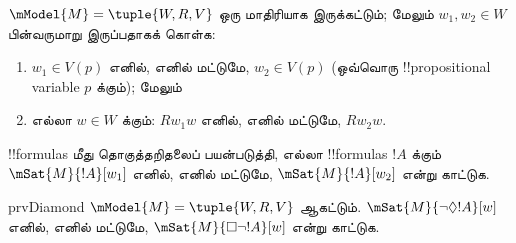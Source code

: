 \documentclass[../../../include/open-logic-section]{subfiles}
\begin{document}
\begin{prob}
  $\mModel{M} = \tuple{W, R, V}$ ஒரு மாதிரியாக இருக்கட்டும்; மேலும் $w_1,
  w_2 \in W$ பின்வருமாறு இருப்பதாகக் கொள்க:
  \begin{enumerate}
  \item $w_1 \in V(p)$ எனில், எனில் மட்டுமே, $w_2 \in V(p)$ (ஒவ்வொரு
    !!{propositional variable} $p$ க்கும்); மேலும்
  \item எல்லா $w \in W$ க்கும்: $Rw_1w$ எனில், எனில் மட்டுமே, $Rw_2w$.
  \end{enumerate}
  !!{formula}s மீது தொகுத்தறிதலைப் பயன்படுத்தி, எல்லா !!{formula}s $!A$
  க்கும் $\mSat{M}{!A}[w_1]$ எனில், எனில் மட்டுமே,
  $\mSat{M}{!A}[w_2]$ என்று
  காட்டுக.
\end{prob}

\begin{probtag}{prvDiamond}
  $\mModel{M} = \tuple{W, R, V}$ ஆகட்டும். $\mSat{M}{\lnot\Diamond !A}[w]$
  எனில், எனில் மட்டுமே, $\mSat{M}{\Box\lnot!A}[w]$ என்று காட்டுக.
\end{probtag}
\end{document}
